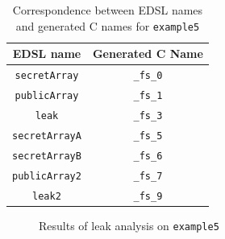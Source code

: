 \documentclass[10pt, conference]{IEEEtran}
\newcommand{\ttt}{\texttt}
\begin{document}
\begin{table}[h]
  \centering
  \begin{tabular}{|c|c|}
    \hline
    EDSL name & Generated C Name \\
    \hline
    \verb|secretArray| & \verb|_fs_0|\\
    \verb|publicArray| & \verb|_fs_1|\\
    \verb|leak| & \verb|_fs_3|\\
    \verb|secretArrayA| & \verb|_fs_5|\\
    \verb|secretArrayB| & \verb|_fs_6|\\
    \verb|publicArray2| & \verb|_fs_7|\\
    \verb|leak2| & \verb|_fs_9|\\
    \hline
  \end{tabular}
\caption{Correspondence between EDSL names and generated C names for \ttt{example5}}
\label{table:Names5}
\end{table}

\begin{figure}[h]
\centering
\caption{Results of leak analysis on \ttt{example5}}
\label{fig:Analysis5}
\end{figure}
\end{document}
